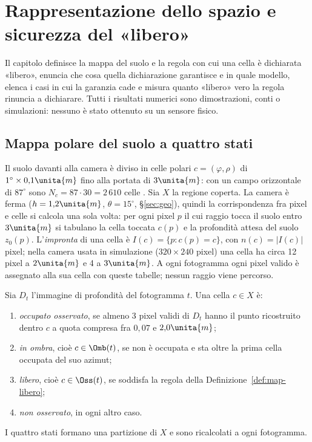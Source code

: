 \section{Rappresentazione dello spazio e sicurezza del «libero»}\label{sec:map}

Il capitolo definisce la mappa del suolo e la regola con cui una cella è dichiarata «libero», enuncia che cosa quella dichiarazione garantisce e in quale modello, elenca i casi in cui la garanzia cade e misura quanto «libero» vero la regola rinuncia a dichiarare. Tutti i risultati numerici sono dimostrazioni, conti o simulazioni: nessuno è stato ottenuto su un sensore fisico.

\subsection{Mappa polare del suolo a quattro stati}\label{sec:map-stati}

Il suolo davanti alla camera è diviso in celle polari $c=(\varphi,\rho)$ di $1^\circ\times0{,}1\unita{m}$ fino alla portata di $3\unita{m}$: con un campo orizzontale di $87^\circ$ sono $N_c=87\cdot30=2\,610$ celle . Sia $X$ la regione coperta. La camera è ferma ($h=1{,}2\unita{m}$, $\theta=15^\circ$, \S\ref{sec:geo}), quindi la corrispondenza fra pixel e celle si calcola una sola volta: per ogni pixel $p$ il cui raggio tocca il suolo entro $3\unita{m}$ si tabulano la cella toccata $c(p)$ e la profondità attesa del suolo $z_0(p)$. L'\emph{impronta} di una cella è $I(c)=\{p: c(p)=c\}$, con $n(c)=|I(c)|$ pixel; nella camera usata in simulazione ($320\times240$ pixel) una cella ha circa 12 pixel a $2\unita{m}$ e 4 a $3\unita{m}$. A ogni fotogramma ogni pixel valido è assegnato alla sua cella con queste tabelle; nessun raggio viene percorso.

\begin{definizione}\label{def:map-stati}
Sia $D_t$ l'immagine di profondità del fotogramma $t$. Una cella $c\in X$ è:
\begin{enumerate}[label=(\roman*)]
\item \emph{occupato osservato}, se almeno 3 pixel validi di $D_t$ hanno il punto ricostruito dentro $c$ a quota compresa fra $0{,}07$ e $2{,}0\unita{m}$;
\item \emph{in ombra}, cioè $c\in\Omb(t)$, se non è occupata e sta oltre la prima cella occupata del suo azimut;
\item \emph{libero}, cioè $c\in\Oss(t)$, se soddisfa la regola della Definizione~\ref{def:map-libero};
\item \emph{non osservato}, in ogni altro caso.
\end{enumerate}
I quattro stati formano una partizione di $X$ e sono ricalcolati a ogni fotogramma.
\end{definizione}

